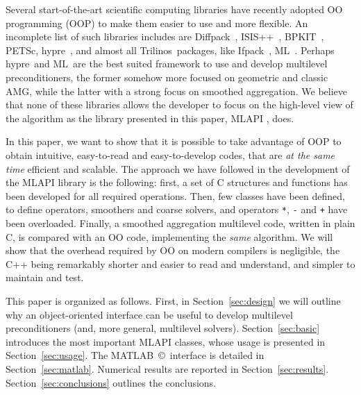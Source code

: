 \documentclass{article}[11pt]
\newcommand{\ML}     {{\sc ML}}
\newcommand{\trilinos}  {{\sc Trilinos}}
\newcommand{\ifpack}  {{\sc Ifpack}}
\newcommand{\MLAPI}  {{\sc MLAPI }}
\newcommand{\mlapi}  {{\sc MLAPI }}
\newcommand{\hypre}  {{\sc hypre}}
\newcommand{\petsc}  {{\sc PETSc}}
\begin{document}
\smallskip

Several start-of-the-art scientific computing libraries have recently adopted
OO programming (OOP) to make them easier to use and more flexible. An
incomplete list of 
such libraries includes are Diffpack~\cite{bruaset97object}, 
ISIS++~\cite{isis-guide}, BPKIT~\cite{bpkit}, \petsc\cite{petsc-guide},
  \hypre~\cite{hypre}, and almost all \trilinos\ packages, like \ifpack~\cite{ifpack-guide}, \ML~\cite{ml-guide}.
  Perhaps \hypre~and \ML~are the best suited framework to use and develop
  multilevel preconditioners, the former somehow more focused on geometric and
  classic AMG, while the latter with a strong focus on smoothed aggregation.
  We believe that none of these libraries allows the developer to focus on the
  high-level view of the algorithm as the library presented in this paper,
  \mlapi, does. 

\smallskip

In this paper, we want to show
that it is possible to take advantage of OOP to obtain intuitive,
easy-to-read and easy-to-develop codes, that are {\sl at the same time}
efficient and scalable. The approach we have followed in the development of
the \mlapi library is the following:
first, a set of C structures and functions has been developed for all 
required operations. Then, few classes have been defined, to define
operators, smoothers and coarse solvers, and operators \verb!*!, \verb!-! and
\verb!+! have been overloaded. Finally, a smoothed aggregation multilevel
code, written in plain C, is compared with an OO code, implementing the 
{\sl same} algorithm.  We will show that the overhead
required by OO on modern compilers is negligible, the C++ being remarkably
shorter and easier to read and understand, and simpler to maintain and test.


\smallskip

This paper is organized as follows. First, in Section~\ref{sec:design}
we will outline why an object-oriented interface can be useful to develop
multilevel preconditioners (and, more general, multilevel solvers).
Section~\ref{sec:basic} introduces the most important \MLAPI classes, whose
usage is presented in Section~\ref{sec:usage}. The MATLAB~\copyright~interface is
detailed in Section~\ref{sec:matlab}. Numerical results are reported
in Section~\ref{sec:results}.
Section~\ref{sec:conclusions} outlines the conclusions.
\end{document}
